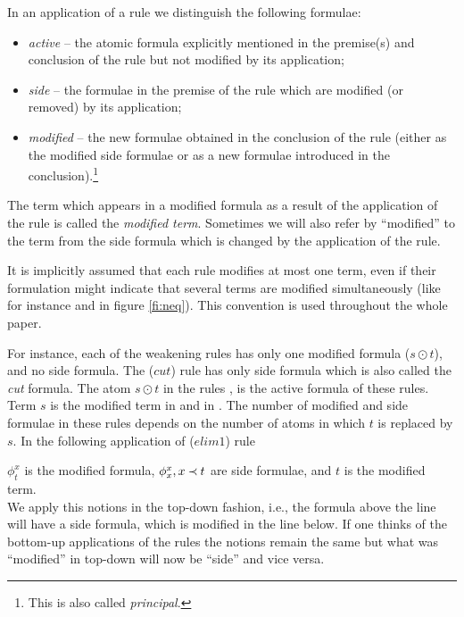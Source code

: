 \begin{DEFINITION} In an application of a rule we distinguish the following
formulae:
\begin{itemize}\MyLPar
\item {\em active} -- the atomic formula explicitly mentioned in the premise(s)
and conclusion of the rule but not modified by its application;
\item {\em side} -- the formulae in the premise of the rule which are modified
(or removed) by its application;
\item {\em modified} -- the new formulae obtained in the conclusion of the rule
(either as the modified side formulae or as a new formulae introduced in the 
conclusion).\footnote{This is also called {\em principal}.}
\end{itemize}
\end{DEFINITION}
\noindent
The term which appears in a modified formula as a 
result of the application of the rule is called the {\em modified
term}. Sometimes we will also refer by ``modified'' to the term from the side
formula which is changed by the application of the rule.

It is implicitly assumed that each rule modifies at most one term, even if
their formulation might indicate that several terms are modified
simultaneously (like for instance  and  in figure \ref{fi:neq}). This
convention is used throughout the whole paper.
\begin{EXAMPLE}
For instance, each of the weakening rules 
has only one modified formula ($s\odot t$), and no side formula.
The ($cut$) rule  has only side formula which is
also called the {\em cut} formula. The atom $s\odot t$ in the rules , 
 is the active formula of these rules. 
Term $s$ is the modified term in
 and in . The number of modified and side formulae in
these rules depends on the number of atoms in which $t$ is replaced by $s$. 
In the following application of ($elim1$) rule 
\begin{center}
\end{center}
\noindent $\phi_t^x$ is the modified formula, $\phi_x^x, x\mathbin{\prec} t$ are side formulae, 
and $t$ is the modified term.\\
We apply this notions in the top-down fashion, i.e., the formula above the
line will have a side formula, which is modified in the line below.
If one thinks of the bottom-up applications of the rules the notions remain the same but
what was ``modified'' in top-down will now be ``side'' and vice versa.
\end{EXAMPLE}

